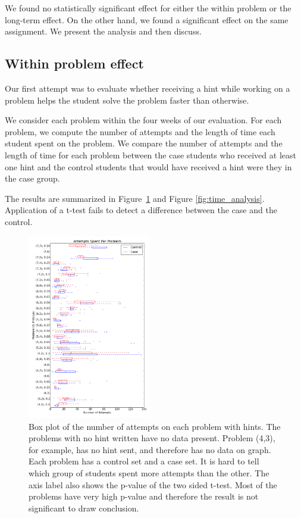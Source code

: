 \documentclass{sigchi}
\begin{document}
We found no statistically significant effect for either the within problem or the long-term effect. On the other hand, we found a significant effect on the same assignment. We present the analysis and then discuss.

\subsection{Within problem effect}

Our first attempt was to evaluate whether receiving a hint while
working on a problem helps the student solve the problem faster than otherwise.

We consider each problem within the four weeks of our evaluation. For each problem, we compute the number of attempts and the length of time each student spent on the problem. We compare the number of attempts and the length of time for each problem between the case students who
received at least one hint and the control students that would have received a hint were they in the case group.

The results are summarized in Figure~\ref{fig:tries_analysis} and Figure \ref{fig:time_analysis}. Application of a t-test fails
to detect a difference between the case and the control.

\begin{figure}[ht]
  \centering
  \includegraphics[width=0.48\textwidth]{image/problem_tries.png}
  \caption{Box plot of the number of attempts on each problem with hints. The problems with no hint written have no data present. Problem (4,3), for example, has no hint sent, and therefore has no data on graph. Each problem has a control set and a case set. It is hard to tell which group of students spent more attempts than the other. The axis label also shows the p-value of the two sided t-test. Most of the problems have very high p-value and therefore the result is not significant to draw conclusion.}
   \label{fig:tries_analysis}
\end{figure}
\end{document}
